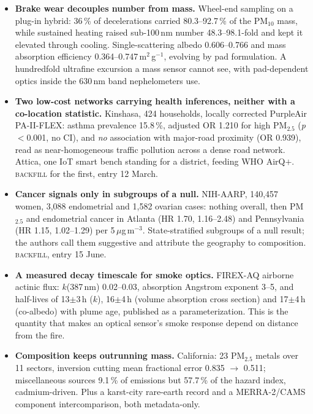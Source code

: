 \documentclass[10pt]{article}
\begin{document}
\footnotesize
\begin{itemize}

\item \textbf{Brake wear decouples number from mass.} Wheel-end sampling on a plug-in hybrid: 36\,\% of decelerations carried 80.3--92.7\,\% of the PM$_{10}$ mass, while sustained heating raised sub-100\,nm number 48.3--98.1-fold and kept it elevated through cooling. Single-scattering albedo 0.606--0.766 and mass absorption efficiency 0.364--0.747\,m$^2$\,g$^{-1}$, evolving by pad formulation. A hundredfold ultrafine excursion a mass sensor cannot see, with pad-dependent optics inside the 630\,nm band nephelometers use.

\item \textbf{Two low-cost networks carrying health inferences, neither with a co-location statistic.} Kinshasa, 424 households, locally corrected PurpleAir PA-II-FLEX: asthma prevalence 15.8\,\%, adjusted OR 1.210 for high PM$_{2.5}$ (\emph{p}$<$0.001, no CI), and \emph{no} association with major-road proximity (OR 0.939), read as near-homogeneous traffic pollution across a dense road network. Attica, one IoT smart bench standing for a district, feeding WHO AirQ$+$. \textsc{backfill} for the first, entry 12 March.

\item \textbf{Cancer signals only in subgroups of a null.} NIH-AARP, 140,457 women, 3,088 endometrial and 1,582 ovarian cases: nothing overall, then PM$_{2.5}$ and endometrial cancer in Atlanta (HR 1.70, 1.16--2.48) and Pennsylvania (HR 1.15, 1.02--1.29) per 5\,$\mu$g\,m$^{-3}$. State-stratified subgroups of a null result; the authors call them suggestive and attribute the geography to composition. \textsc{backfill}, entry 15 June.

\item \textbf{A measured decay timescale for smoke optics.} FIREX-AQ airborne actinic flux: $k$(387\,nm) 0.02--0.03, absorption Angstrom exponent 3--5, and half-lives of 13$\pm$3\,h ($k$), 16$\pm$4\,h (volume absorption cross section) and 17$\pm$4\,h (co-albedo) with plume age, published as a parameterization. This is the quantity that makes an optical sensor's smoke response depend on distance from the fire.

\item \textbf{Composition keeps outrunning mass.} California: 23 PM$_{2.5}$ metals over 11 sectors, inversion cutting mean fractional error 0.835 $\rightarrow$ 0.511; miscellaneous sources 9.1\,\% of emissions but 57.7\,\% of the hazard index, cadmium-driven. Plus a karst-city rare-earth record and a MERRA-2/CAMS component intercomparison, both metadata-only.


\end{itemize}
\end{document}
